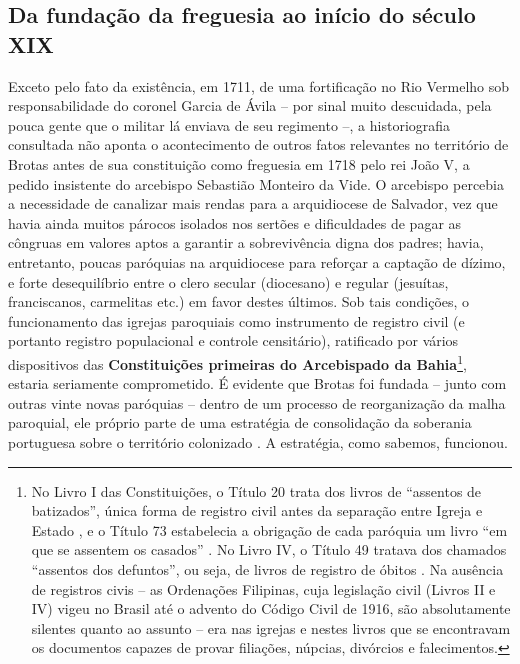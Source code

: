\subsection{Da fundação da freguesia ao início do século XIX}

Exceto pelo fato da existência, em 1711, de uma fortificação no Rio Vermelho sob responsabilidade do coronel Garcia de Ávila -- por sinal muito descuidada, pela pouca gente que o militar lá enviava de seu regimento \cite[p. 99]{cabral_manuscritos_1883} --, a historiografia consultada não aponta o acontecimento de outros fatos relevantes no território de Brotas antes de sua constituição como freguesia em 1718 pelo rei João V, a pedido insistente do arcebispo Sebastião Monteiro da Vide. O arcebispo percebia a necessidade de canalizar mais rendas para a arquidiocese de Salvador, vez que havia ainda muitos párocos isolados nos sertões e dificuldades de pagar as côngruas em valores aptos a garantir a sobrevivência digna dos padres; havia, entretanto, poucas paróquias na arquidiocese para reforçar a captação de dízimo, e forte desequilíbrio entre o clero secular (diocesano) e regular (jesuítas, franciscanos, carmelitas etc.) em favor destes últimos. Sob tais condições, o funcionamento das igrejas paroquiais como instrumento de registro civil (e portanto registro populacional e controle censitário), ratificado por vários dispositivos das \textbf{Constituições primeiras do Arcebispado da Bahia}\footnote{No Livro I das Constituições, o Título 20 trata dos livros de ``assentos de batizados'', única forma de registro civil antes da separação entre Igreja e Estado \cite[pp.~28-31]{vide_const_2007}, e o Título 73 estabelecia a obrigação de cada paróquia um livro ``em que se assentem os casados'' \cite[pp.~130-131]{vide_const_2007}. No Livro IV, o Título 49 tratava dos chamados ``assentos dos defuntos'', ou seja, de livros de registro de óbitos \cite[pp.~292-293]{vide_const_2007}. Na ausência de registros civis -- as Ordenações Filipinas, cuja legislação civil (Livros II e IV) vigeu no Brasil até o advento do Código Civil de 1916, são absolutamente silentes quanto ao assunto -- era nas igrejas e nestes livros que se encontravam os documentos capazes de provar filiações, núpcias, divórcios e falecimentos.}, estaria seriamente comprometido. É evidente que Brotas foi fundada -- junto com outras vinte novas paróquias -- dentro de um processo de reorganização da malha paroquial, ele próprio parte de uma estratégia de consolidação da soberania portuguesa sobre o território colonizado \cite[pp.~26-30]{vivas_botelho_2011}. A estratégia, como sabemos, funcionou.

